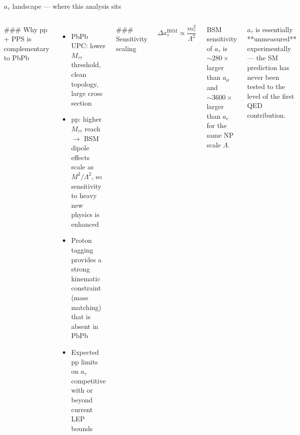 \begin{frame}{\(a_\tau\) landscape --- where this analysis sits}
\protect{}\label{a_tau-landscape-where-this-analysis-sits}
\begin{columns}

### Why pp + PPS is complementary to PbPb

\begin{itemize}
\item PbPb UPC: lower $M_{\tau\tau}$ threshold, clean topology, large cross section
\item pp: higher $M_{\tau\tau}$ reach $\to$ BSM dipole effects scale as $M^2 / \Lambda^2$, so sensitivity to heavy new physics is enhanced
\item Proton tagging provides a strong kinematic constraint (mass matching) that is absent in PbPb
\item Expected pp limits on $a_\tau$ competitive with or beyond current LEP bounds
\end{itemize}


### Sensitivity scaling

$$\Delta a_\tau^\text{BSM} \propto \frac{m_\tau^2}{\Lambda^2}$$

BSM sensitivity of $a_\tau$ is $\sim 280\times$ larger than $a_\mu$ and $\sim 3600\times$ larger than $a_e$ for the same NP scale $\Lambda$.

\medskip
$a_\tau$ is essentially **unmeasured** experimentally — the SM prediction has never been tested to the level of the first QED contribution.

\end{columns}
\end{frame}

